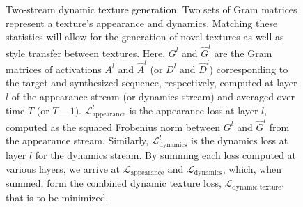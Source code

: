 \begin{figure}[t]
\begin{center}
\end{center}
\vspace{-0.45cm}
\caption[Two-stream dynamic texture generation.]{Two-stream dynamic texture generation.
Two sets of Gram matrices represent a texture's appearance and 
dynamics.
Matching these statistics will allow for the generation of novel
textures as well as style transfer between textures. Here, $G^l$ and $\hat{G}^l$ are the Gram matrices of activations $A^l$ and $\hat{A}^l$ (or $D^l$ and $\hat{D}^l$) corresponding to the target and synthesized sequence, respectively, computed at layer $l$ of the appearance stream (or dynamics stream) and averaged over time $T$ (or $T-1$). $\mathcal{L}_\text{appearance}^l$ is the appearance loss at layer $l$, computed as the squared Frobenius norm between $G^l$ and $\hat{G}^l$ from the appearance stream. Similarly, $\mathcal{L}_\text{dynamics}^l$ is the dynamics loss at layer $l$ for the dynamics stream. By summing each loss computed at various layers, we arrive at $\mathcal{L}_\text{appearance}$ and $\mathcal{L}_\text{dynamics}$, which, when summed, form the combined dynamic texture loss, $\mathcal{L}_\text{dynamic texture}$, that is to be minimized.}
\label{fig:architecture}
\end{figure}
